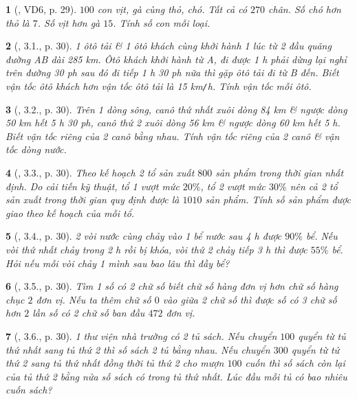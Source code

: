 \documentclass{article}
\newtheorem{baitoan}{}
\begin{document}
\begin{baitoan}[\cite{Binh_boi_duong_Toan_9_tap_2}, VD6, p. 29]
	$100$ con vịt, gà cùng thỏ, chó. Tất cả có $270$ chân. Số chó hơn thỏ là $7$. Số vịt hơn gà $15$. Tính số con mỗi loại.
\end{baitoan}

\begin{baitoan}[\cite{Binh_boi_duong_Toan_9_tap_2}, 3.1., p. 30]
	1 ôtô tải \& 1 ôtô khách cùng khởi hành 1 lúc từ 2 đầu quãng đường AB dài {\rm285 km}. Ôtô khách khởi hành từ A, đi được {\rm1 h} phải dừng lại nghỉ trên đường {\rm30 ph} sau đó đi tiếp {\rm1 h 30 ph} nữa thì gặp ôtô tải đi từ B đến. Biết vận tốc ôtô khách hơn vận tốc ôtô tải là {\rm15 km{\tt/}h}. Tính vận tốc mỗi ôtô.
\end{baitoan}

\begin{baitoan}[\cite{Binh_boi_duong_Toan_9_tap_2}, 3.2., p. 30]
	Trên 1 dòng sông, canô thứ nhất xuôi dòng {\rm84 km} \& ngược dòng {\rm50 km} hết {\rm5 h 30 ph}, canô thứ 2 xuôi dòng {\rm56 km} \& ngược dòng {\rm60 km} hết {\rm5 h}. Biết vận tốc riêng của 2 canô bằng nhau. Tính vận tốc riêng của 2 canô \& vận tốc dòng nước.
\end{baitoan}

\begin{baitoan}[\cite{Binh_boi_duong_Toan_9_tap_2}, 3.3., p. 30]
	Theo kế hoạch 2 tổ sản xuất $800$ sản phẩm trong thời gian nhất định. Do cải tiến kỹ thuật, tổ 1 vượt mức $20\%$, tổ 2 vượt mức $30\%$ nên cả 2 tổ sản xuất trong thời gian quy định được là $1010$ sản phẩm. Tính số sản phẩm được giao theo kế hoạch của mỗi tổ.
\end{baitoan}

\begin{baitoan}[\cite{Binh_boi_duong_Toan_9_tap_2}, 3.4., p. 30]
	2 vòi nước cùng chảy vào 1 bể nước sau {\rm4 h} được $90\%$ bể. Nếu vòi thứ nhất chảy trong {\rm2 h} rồi bị khóa, vòi thứ 2 chảy tiếp {\rm3 h} thì được $55\%$ bể. Hỏi nếu mỗi vòi chảy 1 mình sau bao lâu thì đầy bể?
\end{baitoan}

\begin{baitoan}[\cite{Binh_boi_duong_Toan_9_tap_2}, 3.5., p. 30]
	Tìm 1 số có 2 chữ số biết chữ số hàng đơn vị hơn chữ số hàng chục $2$ đơn vị. Nếu ta thêm chữ số $0$ vào giữa 2 chữ số thì được số có 3 chữ số hơn $2$ lần số có 2 chữ số ban đầu $472$ đơn vị.
\end{baitoan}

\begin{baitoan}[\cite{Binh_boi_duong_Toan_9_tap_2}, 3.6., p. 30]
	1 thư viện nhà trường có 2 tủ sách. Nếu chuyển $100$ quyển từ tủ thứ nhất sang tủ thứ 2 thì số sách 2 tủ bằng nhau. Nếu chuyển $300$ quyển từ tử thứ 2 sang tủ thứ nhất đồng thời tủ thứ 2 cho mượn $100$ cuốn thì số sách còn lại của tủ thứ 2 bằng nửa số sách có trong tủ thứ nhất. Lúc đầu mỗi tủ có bao nhiêu cuốn sách?
\end{baitoan}
\end{document}
